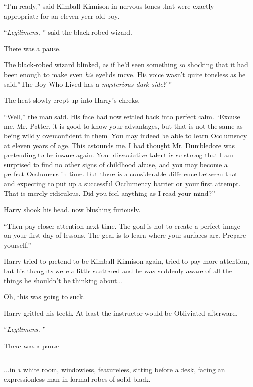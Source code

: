 ``I'm ready,'' said Kimball Kinnison in nervous tones that were exactly
appropriate for an eleven-year-old boy.

``\emph{Legilimens,} '' said the black-robed wizard.

There was a pause.

The black-robed wizard blinked, as if he'd seen something so shocking
that it had been enough to make even \emph{his} eyelids move. His voice
wasn't quite toneless as he said,''The Boy-Who-Lived has a
\emph{mysterious dark side?} ''

The heat slowly crept up into Harry's cheeks.

``Well,'' the man said. His face had now settled back into perfect calm.
``Excuse me. Mr. Potter, it is good to know your advantages, but that is
not the same as being wildly overconfident in them. You may indeed be
able to learn Occlumency at eleven years of age. This astounds me. I had
thought Mr. Dumbledore was pretending to be insane again. Your
dissociative talent is so strong that I am surprised to find no other
signs of childhood abuse, and you may become a perfect Occlumens in
time. But there is a considerable difference between that and expecting
to put up a successful Occlumency barrier on your first attempt. That is
merely ridiculous. Did you feel anything as I read your mind?''

Harry shook his head, now blushing furiously.

``Then pay closer attention next time. The goal is not to create a
perfect image on your first day of lessons. The goal is to learn where
your surfaces are. Prepare yourself.''

Harry tried to pretend to be Kimball Kinnison again, tried to pay more
attention, but his thoughts were a little scattered and he was suddenly
aware of all the things he shouldn't be thinking about...

Oh, this was going to suck.

Harry gritted his teeth. At least the instructor would be Obliviated
afterward.

``\emph{Legilimens.} ''

There was a pause -

\begin{center}\rule{3in}{0.4pt}\end{center}

...in a white room, windowless, featureless, sitting before a desk,
facing an expressionless man in formal robes of solid black.

